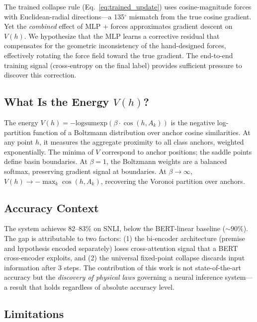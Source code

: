 \documentclass[11pt]{article}
\newcommand{\anchor}[1]{A_{#1}}
\newcommand{\lse}{\mathrm{logsumexp}}
\begin{document}
The trained collapse rule (Eq.~\ref{eq:trained_update}) uses
cosine-magnitude forces with Euclidean-radial directions---a
135$^{\circ}$ mismatch from the true cosine gradient. Yet the
\emph{combined} effect of MLP + forces approximates gradient descent
on $V(h)$. We hypothesize that the MLP learns a corrective residual
that compensates for the geometric inconsistency of the hand-designed
forces, effectively rotating the force field toward the true gradient.
The end-to-end training signal (cross-entropy on the final label)
provides sufficient pressure to discover this correction.

\subsection{What Is the Energy \texorpdfstring{$V(h)$}{V(h)}?}

The energy $V(h) = -\lse(\beta \cdot \cos(h, \anchor{k}))$ is the
negative log-partition function of a Boltzmann distribution over anchor
cosine similarities. At any point $h$, it measures the aggregate
proximity to all class anchors, weighted exponentially. The minima of
$V$ correspond to anchor positions; the saddle points define basin
boundaries. At $\beta=1$, the Boltzmann weights are a balanced softmax,
preserving gradient signal at boundaries. At $\beta \to \infty$,
$V(h) \to -\max_k \cos(h, \anchor{k})$, recovering the Voronoi
partition over anchors.

\subsection{Accuracy Context}

The system achieves 82--83\% on SNLI, below the BERT-linear baseline
(${\sim}90\%$). The gap is attributable to two factors: (1) the
bi-encoder architecture (premise and hypothesis encoded separately)
loses cross-attention signal that a BERT cross-encoder exploits, and
(2) the universal fixed-point collapse discards input information after
3 steps. The contribution of this work is not state-of-the-art accuracy
but the \emph{discovery of physical laws} governing a neural inference
system---a result that holds regardless of absolute accuracy level.

\subsection{Limitations}
\end{document}
